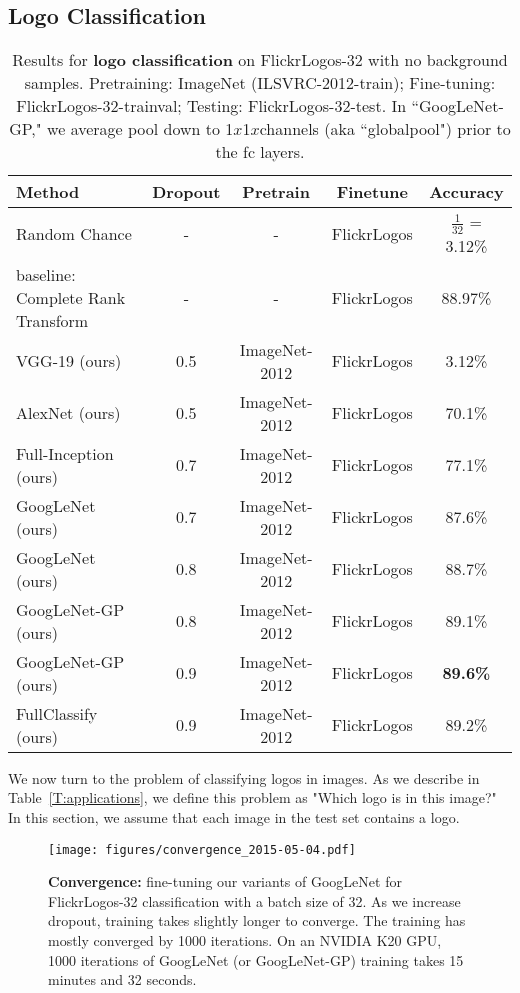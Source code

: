 \documentclass{bmvc2k}
\begin{document}
\subsection{Logo Classification}
\vspace{-0.1in}
\label{sec:classification}


\begin{table}[htb]
\footnotesize
\caption{Results for {\bf logo classification} on FlickrLogos-32 with no background samples. Pretraining: ImageNet (ILSVRC-2012-train); Fine-tuning: FlickrLogos-32-trainval; Testing: FlickrLogos-32-test. In ``GoogLeNet-GP," we average pool down to 1$x$1$x$channels (aka ``globalpool") prior to the fc layers.}
\label{T:logo-classification}
\centering
\begin{tabular}{|p{2.5cm}|c|c|c|c|}
\hline
Method & Dropout & Pretrain & Finetune & Accuracy\\ \hline
Random Chance & - & - & FlickrLogos & $\frac{1}{32}$ = 3.12\% \\ \hline
baseline: Complete Rank Transform~\cite{Boia2014} & - & - & FlickrLogos & 88.97\% \\ \hline
VGG-19 (ours) & 0.5 & ImageNet-2012 & FlickrLogos & 3.12\% \\ \hline
AlexNet (ours) & 0.5 & ImageNet-2012 & FlickrLogos & 70.1\% \\ \hline
Full-Inception (ours) & 0.7 & ImageNet-2012 & FlickrLogos & 77.1\% \\ \hline GoogLeNet (ours) & 0.7 & ImageNet-2012 & FlickrLogos & 87.6\% \\ \hline
GoogLeNet (ours) & 0.8 & ImageNet-2012 & FlickrLogos & 88.7\% \\ \hline
GoogLeNet-GP (ours) & 0.8 & ImageNet-2012 & FlickrLogos & 89.1\% \\ \hline
GoogLeNet-GP (ours) & 0.9 & ImageNet-2012 & FlickrLogos & {\bf 89.6\%} \\ \hline
FullClassify (ours) & 0.9 & ImageNet-2012 & FlickrLogos & 89.2\% \\ \hline
\end{tabular}
\end{table}
We now turn to the problem of classifying logos in images.
As we describe in Table~\ref{T:applications}, we define this problem as "Which logo is in this image?"
In this section, we assume that each image in the test set contains a logo.

\begin{figure}[htb]
  \begin{center}
    \texttt{[image: figures/convergence\_2015-05-04.pdf]} 

  \end{center}
    \caption{{\bf Convergence:} fine-tuning our variants of GoogLeNet for FlickrLogos-32 classification with a batch size of 32. As we increase dropout, training takes slightly longer to converge. The training has mostly converged by 1000 iterations. On an NVIDIA K20 GPU, 1000 iterations of GoogLeNet (or GoogLeNet-GP) training takes 15 minutes and 32 seconds.}
    
   \label{fig:convergence}
\end{figure}
\end{document}
